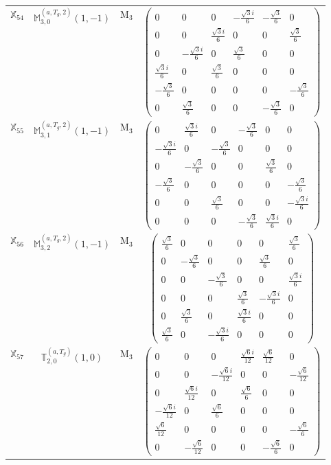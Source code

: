 \documentclass[fleqn,10pt,landscape]{article}
\begin{document}
\begin{itemize}
\begin{center}
\begin{longtable}{c|c|c|c}
$ \mathbb{X}_{54} $ & $\mathbb{M}_{3,0}^{(a,T_{g},2)}(1,-1)$ & M$_{3}$ & $\begin{pmatrix} 0 & 0 & 0 & - \frac{\sqrt{3} i}{6} & - \frac{\sqrt{3}}{6} & 0 \\ 0 & 0 & \frac{\sqrt{3} i}{6} & 0 & 0 & \frac{\sqrt{3}}{6} \\ 0 & - \frac{\sqrt{3} i}{6} & 0 & \frac{\sqrt{3}}{6} & 0 & 0 \\ \frac{\sqrt{3} i}{6} & 0 & \frac{\sqrt{3}}{6} & 0 & 0 & 0 \\ - \frac{\sqrt{3}}{6} & 0 & 0 & 0 & 0 & - \frac{\sqrt{3}}{6} \\ 0 & \frac{\sqrt{3}}{6} & 0 & 0 & - \frac{\sqrt{3}}{6} & 0 \end{pmatrix}$ \\
$ \mathbb{X}_{55} $ & $\mathbb{M}_{3,1}^{(a,T_{g},2)}(1,-1)$ & M$_{3}$ & $\begin{pmatrix} 0 & \frac{\sqrt{3} i}{6} & 0 & - \frac{\sqrt{3}}{6} & 0 & 0 \\ - \frac{\sqrt{3} i}{6} & 0 & - \frac{\sqrt{3}}{6} & 0 & 0 & 0 \\ 0 & - \frac{\sqrt{3}}{6} & 0 & 0 & \frac{\sqrt{3}}{6} & 0 \\ - \frac{\sqrt{3}}{6} & 0 & 0 & 0 & 0 & - \frac{\sqrt{3}}{6} \\ 0 & 0 & \frac{\sqrt{3}}{6} & 0 & 0 & - \frac{\sqrt{3} i}{6} \\ 0 & 0 & 0 & - \frac{\sqrt{3}}{6} & \frac{\sqrt{3} i}{6} & 0 \end{pmatrix}$ \\
$ \mathbb{X}_{56} $ & $\mathbb{M}_{3,2}^{(a,T_{g},2)}(1,-1)$ & M$_{3}$ & $\begin{pmatrix} \frac{\sqrt{3}}{6} & 0 & 0 & 0 & 0 & \frac{\sqrt{3}}{6} \\ 0 & - \frac{\sqrt{3}}{6} & 0 & 0 & \frac{\sqrt{3}}{6} & 0 \\ 0 & 0 & - \frac{\sqrt{3}}{6} & 0 & 0 & \frac{\sqrt{3} i}{6} \\ 0 & 0 & 0 & \frac{\sqrt{3}}{6} & - \frac{\sqrt{3} i}{6} & 0 \\ 0 & \frac{\sqrt{3}}{6} & 0 & \frac{\sqrt{3} i}{6} & 0 & 0 \\ \frac{\sqrt{3}}{6} & 0 & - \frac{\sqrt{3} i}{6} & 0 & 0 & 0 \end{pmatrix}$ \\
$ \mathbb{X}_{57} $ & $\mathbb{T}_{2,0}^{(a,T_{g})}(1,0)$ & M$_{3}$ & $\begin{pmatrix} 0 & 0 & 0 & \frac{\sqrt{6} i}{12} & \frac{\sqrt{6}}{12} & 0 \\ 0 & 0 & - \frac{\sqrt{6} i}{12} & 0 & 0 & - \frac{\sqrt{6}}{12} \\ 0 & \frac{\sqrt{6} i}{12} & 0 & \frac{\sqrt{6}}{6} & 0 & 0 \\ - \frac{\sqrt{6} i}{12} & 0 & \frac{\sqrt{6}}{6} & 0 & 0 & 0 \\ \frac{\sqrt{6}}{12} & 0 & 0 & 0 & 0 & - \frac{\sqrt{6}}{6} \\ 0 & - \frac{\sqrt{6}}{12} & 0 & 0 & - \frac{\sqrt{6}}{6} & 0 \end{pmatrix}$ \\

\end{longtable}
\end{center}
\end{itemize}
\end{document}
